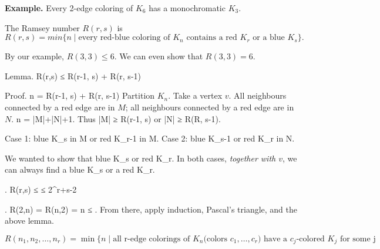\textbf{Example.} Every 2-edge coloring of $K_6$ has a monochromatic $K_3$.





\begin{definition}
The Ramsey number $R(r,s)$ is
\[
    R(r,s) =
        min \{n\mid \text{every red-blue coloring of $K_n$ contains a red $K_r$ or a blue $K_s$}\}.
\]
\end{definition}

By our example, $R(3,3) ≤ 6$. We can even show that $R(3,3) = 6$.


Lemma. R(r,s) ≤ R(r-1, s) + R(r, s-1)

Proof. n = R(r-1, s) + R(r, s-1)
Partition $K_n$. Take a vertex $v$. All neighbours connected by a red edge are in $M$; all neighbours connected by a red edge are in $N$.
n = |M|+|N|+1. Thus
|M| ≥ R(r-1, s) or |N| ≥ R(R, s-1).

Case 1: \exists blue K_s in M or \exists red K_{r-1} in M.
Case 2: \exists blue K_{s-1} or red K_r in N.

We wanted to show that \exists blue K_s or \exists red K_r.
In both cases, \emph{together with $v$}, we can always find a blue K_s or a red K_r.

\Corollary. R(r,s) ≤  ≤ 2^{r+s-2}

\Proof. R(2,n) = R(n,2) = n ≤ . From there, apply induction, Pascal's triangle, and the above lemma.

\begin{definition}
\[
    R(n_1,n_2,\ldots,n_r) =
    \min \{ n \mid
        \text{all r-edge colorings of $K_n$
        (colors $c_1,\ldots,c_r$) have a
        $c_j$-colored $K_j$ for some j}
\]
\end{definition}











